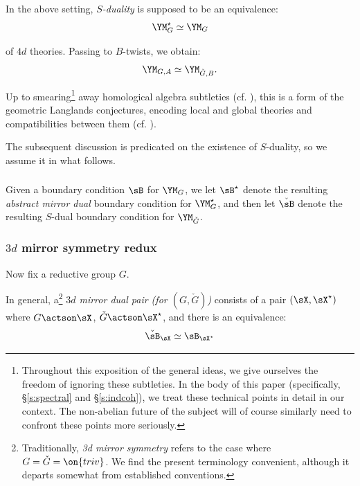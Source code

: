 \subsubsection{}

In the above setting, \emph{$S$-duality} is supposed to be an equivalence:
%
\[
\YM_G^{\star} \simeq \YM_G
\]

 of $4d$ theories. Passing to $B$-twists, we obtain:
%
\[
\YM_{G,A} \simeq \YM_{\check{G},B}.
\]

 Up to smearing\footnote{Throughout this exposition of the general ideas,
we give ourselves the freedom of ignoring these subtleties.
In the body of this paper (specifically, \S \ref{s:spectral} and \S \ref{s:indcoh}),
we treat these technical points in detail in our context. The non-abelian future of the
subject will of course similarly need to confront these points more seriously.}
away homological algebra subtleties
(cf. \cite{arinkin-gaitsgory}), this is a form of the geometric Langlands
conjectures, encoding local and global theories and compatibilities
between them (cf. \cite{quantum-langlands-summary}).

The subsequent discussion is predicated on the existence of $S$-duality, so
we assume it in what follows.

\subsubsection{}

Given a boundary condition $\sB$ for $\YM_G$, we let
$\sB^{\star}$ denote the resulting \emph{abstract mirror dual}
boundary condition for $\YM_G^{\star}$, and then let
$\check{\sB}$ denote the resulting $S$-dual boundary condition for
$\YM_{\check{G}}$.

\subsubsection{$3d$ mirror symmetry redux}

Now fix a reductive group $G$.

In general, a\footnote{Traditionally, \emph{3d mirror symmetry} refers to
the case where $G = \check{G} = \on{triv}$. We find the present terminology
convenient, although it departs somewhat from established conventions.}
\emph{$3d$ mirror dual pair (for $(G,\check{G})$)}
consists of a pair $(\sX,\sX^{\star})$ where $G \actson \sX$,
$\check{G} \actson \sX^{\star}$, and there is an equivalence:
%
\[
\check{\sB}_{\sX} \simeq \sB_{\sX^{\star}}
\]

